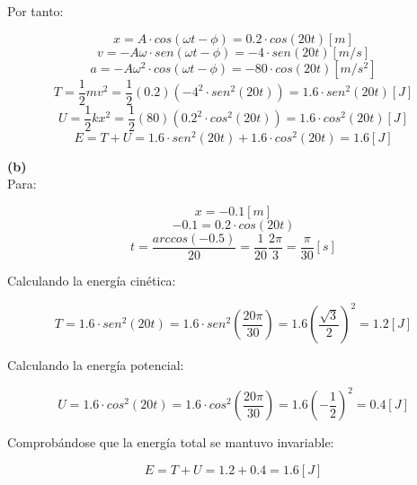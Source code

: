 \documentclass[letter,11pt]{article}
\begin{document}
Por tanto:

\begin{equation}
    x = A \cdot cos (\omega t - \phi) = 0.2 \cdot cos (20t) [m]
\end{equation}
\begin{equation}
    v = -A \omega \cdot sen (\omega t - \phi) = -4 \cdot sen (20t) [m/s]
\end{equation}
\begin{equation}
    a = -A \omega^2 \cdot cos (\omega t - \phi) = -80 \cdot cos(20t) [m/s^2]
\end{equation}
\begin{equation}
    T = \frac{1}{2} m v^2 = \frac{1}{2} (0.2) (-4^2 \cdot sen^2(20t)) = 1.6 \cdot sen^2(20t) [J]
\end{equation}
\begin{equation}
    U = \frac{1}{2} k x^2 = \frac{1}{2} (80) (0.2^2 \cdot cos^2(20t)) = 1.6 \cdot cos^2(20t) [J]
\end{equation}
\begin{equation}
    E = T + U = 1.6 \cdot sen^2(20t) + 1.6 \cdot cos^2(20t) = 1.6 [J]
\end{equation}

\textbf{(b)} \\

Para:

\begin{equation*}
    x = -0.1 [m]
\end{equation*}
\begin{equation*}
    -0.1 = 0.2 \cdot cos(20t)
\end{equation*}
\begin{equation*}
    t = \frac{arccos(-0.5)}{20} = \frac{1}{20} \frac{2 \pi}{3} = \frac{\pi}{30} [s]
\end{equation*}

Calculando la energía cinética:

\begin{equation}
    T = 1.6 \cdot sen^2(20t) = 1.6 \cdot sen^2\left(\frac{20 \pi}{30}\right) = 1.6 \left(\frac{\sqrt{3}}{2}\right)^2 = 1.2 [J]
\end{equation}

Calculando la energía potencial:

\begin{equation}
    U = 1.6 \cdot cos^2(20t) = 1.6 \cdot cos^2\left(\frac{20 \pi}{30}\right) = 1.6 \left(-\frac{1}{2}\right)^2 = 0.4 [J]
\end{equation}

Comprobándose que la energía total se mantuvo invariable:

\begin{equation}
    E = T + U = 1.2 + 0.4 = 1.6 [J]
\end{equation}
\end{document}

